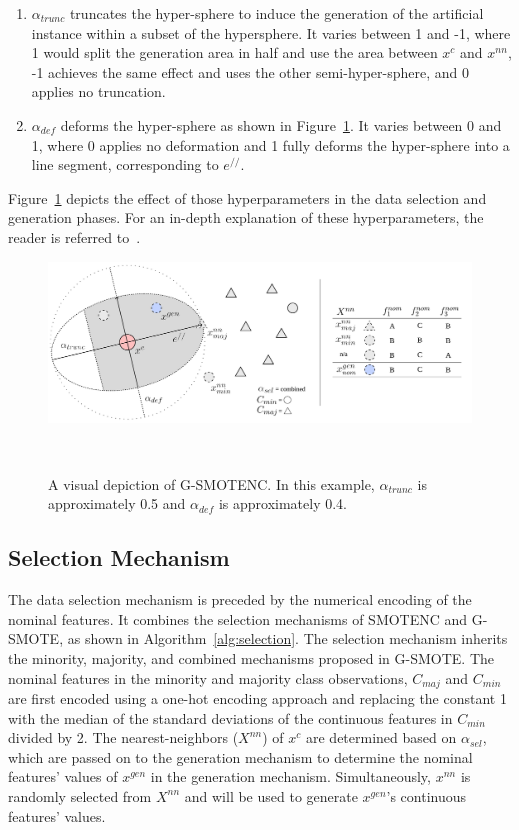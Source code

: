 \documentclass[preprint,12pt]{elsarticle}
\begin{document}
{\begin{enumerate}

    \item $\alpha_{trunc}$ truncates the hyper-sphere to induce the generation
        of the artificial instance within a subset of the hypersphere. It
        varies between 1 and -1, where 1 would split the generation area in
        half and use the area between $x^c$ and $x^{nn}$, -1 achieves the same
        effect and uses the other semi-hyper-sphere, and 0 applies no
        truncation.

    \item $\alpha_{def}$ deforms the hyper-sphere as shown in
        Figure~\ref{fig:gsmote}. It varies between 0 and 1, where 0 applies no
        deformation and 1 fully deforms the hyper-sphere into a line segment,
        corresponding to $e^{//}$.

\end{enumerate}

Figure~\ref{fig:gsmote} depicts the effect of those hyperparameters in the
data selection and generation phases. For an in-depth explanation of these
hyperparameters, the reader is referred to~\cite{douzas2019geometric}.

\begin{figure}
	\centering
	\includegraphics[width=\linewidth]{../analysis/g-smote}
    \caption{A visual depiction of G-SMOTENC. In this example,
        $\alpha_{trunc}$ is approximately 0.5 and $\alpha_{def}$ is
        approximately 0.4.
    }~\label{fig:gsmote}
\end{figure}

\subsection{Selection Mechanism}

The data selection mechanism is preceded by the numerical encoding of the
nominal features. It combines the selection mechanisms of SMOTENC and
G-SMOTE, as shown in Algorithm~\ref{alg:selection}. The selection mechanism
inherits the minority, majority, and combined mechanisms proposed in G-SMOTE.
The nominal features in the minority and majority class observations,
$C_{maj}$ and $C_{min}$ are first encoded using a one-hot encoding approach
and replacing the constant 1 with the median of the standard deviations of the
continuous features in $C_{min}$ divided by 2. The nearest-neighbors
($X^{nn}$) of $x^c$ are determined based on $\alpha_{sel}$, which are passed
on to the generation mechanism to determine the nominal features' values of
$x^{gen}$ in the generation mechanism. Simultaneously, $x^{nn}$ is randomly
selected from $X^{nn}$ and will be used to generate $x^{gen}$'s continuous
features' values.


}
\end{document}
